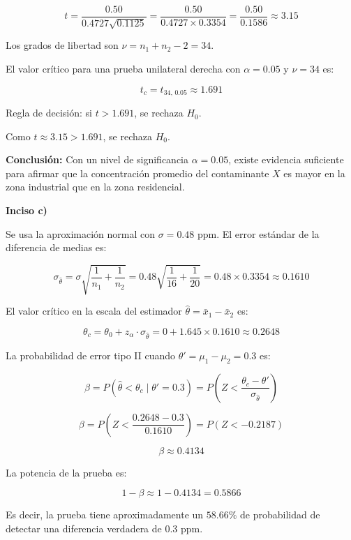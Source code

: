 \documentclass[a4paper]{article}
\begin{document}
$$t = \frac{0.50}{0.4727 \sqrt{0.1125}} = \frac{0.50}{0.4727 \times 0.3354} = \frac{0.50}{0.1586} \approx 3.15$$

Los grados de libertad son $\nu = n_1 + n_2 - 2 = 34$.

El valor crítico para una prueba unilateral derecha con $\alpha = 0.05$ y $\nu = 34$ es:

$$t_c = t_{34,\, 0.05} \approx 1.691$$

Regla de decisión: si $t > 1.691$, se rechaza $H_0$.

Como $t \approx 3.15 > 1.691$, se rechaza $H_0$.

\textbf{Conclusión:} Con un nivel de significancia $\alpha = 0.05$, existe evidencia suficiente para afirmar que la concentración promedio del contaminante $X$ es mayor en la zona industrial que en la zona residencial.

\textbf{Inciso c)}

Se usa la aproximación normal con $\sigma = 0.48$ ppm. El error estándar de la diferencia de medias es:

$$\sigma_{\hat{\theta}} = \sigma \sqrt{\frac{1}{n_1} + \frac{1}{n_2}} = 0.48 \sqrt{\frac{1}{16} + \frac{1}{20}} = 0.48 \times 0.3354 \approx 0.1610$$

El valor crítico en la escala del estimador $\hat{\theta} = \bar{x}_1 - \bar{x}_2$ es:

$$\theta_c = \theta_0 + z_\alpha \cdot \sigma_{\hat{\theta}} = 0 + 1.645 \times 0.1610 \approx 0.2648$$

La probabilidad de error tipo II cuando $\theta' = \mu_1 - \mu_2 = 0.3$ es:

$$\beta = P(\hat{\theta} < \theta_c \mid \theta' = 0.3) = P\left(Z < \frac{\theta_c - \theta'}{\sigma_{\hat{\theta}}}\right)$$

$$\beta = P\left(Z < \frac{0.2648 - 0.3}{0.1610}\right) = P(Z < -0.2187)$$

$$\beta \approx 0.4134$$

La potencia de la prueba es:

$$1 - \beta \approx 1 - 0.4134 = 0.5866$$

Es decir, la prueba tiene aproximadamente un $58.66\%$ de probabilidad de detectar una diferencia verdadera de $0.3$ ppm.


 
\end{document}

